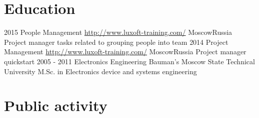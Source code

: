 \documentclass[11pt,a4paper]{moderncv}
\begin{document}
\section{Education}
  \cventry
    {2015}
    {People Management}
    {\url{http://www.luxoft-training.com/}}
    {Moscow}{Russia}
    {Project manager tasks related to grouping people into team}
  \cventry
    {2014}
    {Project Management}
    {\url{http://www.luxoft-training.com/}}
    {Moscow}{Russia}
    {Project manager quickstart}
  \cventry
    {2005 - 2011}
    {Electronics Engineering}
    {Bauman's Moscow State Technical University}
    {}{}
    {M.Sc. in Electronics device and systems engineering}
\section{Public activity}
\end{document}
